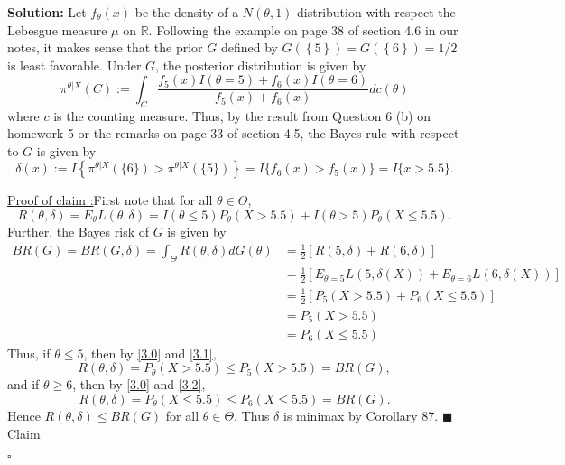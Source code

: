 \documentclass[12pt]{article}
\newcounter{ProofCounter}
\newcounter{ClaimCounter}[ProofCounter]
\newenvironment{Solution}{\stepcounter{ProofCounter}\textbf{Solution:}}{\hfill$\square$}
\newenvironment{claim}[1]{\vspace{1mm}\stepcounter{ClaimCounter}\par\noindent\underline{\bf Claim \theClaimCounter:}\space#1}{}
\newenvironment{claimproof}[1]{\par\noindent\underline{Proof of claim \theClaimCounter:}\space#1}{\hfill $\blacksquare$ Claim \theClaimCounter}
\begin{document}
\begin{Solution}
  Let $f_{\theta}(x)$ be the density of a $N(\theta, 1)$ distribution with respect the Lebesgue measure $\mu$ on $\mathbb{R}$.
  Following the example on page 38 of section 4.6 in our notes, it makes sense that the prior $G$ defined by $G(\left\{ 5 \right\}) = G(\left\{ 6
  \right\}) = 1/2$ is least favorable. Under $G$, the posterior distribution is given by 
  \[
    \pi^{\theta | X}(C) := \int_{C} \frac{f_{5}(x)I(\theta = 5) + f_{6}(x)I(\theta = 6)}{f_{5}(x) + f_{6}(x)} dc(\theta)
  \]
  where $c$ is the counting measure. Thus, by the result from Question 6 (b) on homework 5 or the remarks on page 33 of section 4.5, the Bayes rule with respect to $G$ is given by 
  \[
    \delta(x) := I\left\{ \pi^{\theta|X}(\{6\}) > \pi^{\theta |X}(\{5\}) \right\} = I\{f_{6}(x) > f_{5}(x)\} = I\{x > 5.5\}.
  \]
  \begin{claimproof}
    First note that for all $\theta \in \Theta$,
    \begin{equation}
      R(\theta, \delta) = E_{\theta}L(\theta, \delta) = I(\theta \leq 5)P_{\theta}(X > 5.5) + I(\theta > 5)P_{\theta}(X \leq 5.5).
      \label{3.0}
    \end{equation}
    Further, the Bayes risk of $G$ is given by 
    \begin{align}
      BR(G) = BR(G, \delta) = \int_{\Theta}R(\theta, \delta)dG(\theta) & = \frac{1}{2}\left[ R(5, \delta) + R(6,\delta)  \right] \nonumber \\
      & = \frac{1}{2}\left[ E_{\theta=5}L(5, \delta(X)) + E_{\theta=6}L(6,\delta(X)) \right] \nonumber\\
      & = \frac{1}{2}\left[ P_{5}(X > 5.5) + P_{6}(X \leq 5.5) \right]\nonumber \\
      & = P_{5}(X > 5.5) \label{3.1} \\
      & = P_{6}(X \leq 5.5) \label{3.2}
    \end{align}
    Thus, if $\theta \leq 5$, then by \eqref{3.0} and \eqref{3.1}, 
    \[
      R(\theta, \delta) = P_{\theta}(X > 5.5) \leq P_{5}(X > 5.5) = BR(G),
    \]
    and if $\theta \geq 6$, then by \eqref{3.0} and \eqref{3.2},
    \[
      R(\theta, \delta) = P_{\theta}(X \leq 5.5) \leq P_{6}(X \leq 5.5) = BR(G).
    \]
    Hence $R(\theta, \delta) \leq BR(G)$ for all $\theta \in \Theta$. Thus $\delta$ is minimax by Corollary 87.
  \end{claimproof}

\end{Solution}
\end{document}
